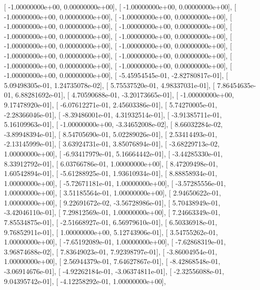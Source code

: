 \documentclass{article}
\begin{document}
       [ -1.00000000e+00,   0.00000000e+00],
       [ -1.00000000e+00,   0.00000000e+00],
       [ -1.00000000e+00,   0.00000000e+00],
       [ -1.00000000e+00,   0.00000000e+00],
       [ -1.00000000e+00,   0.00000000e+00],
       [ -1.00000000e+00,   0.00000000e+00],
       [ -1.00000000e+00,   0.00000000e+00],
       [ -1.00000000e+00,   0.00000000e+00],
       [ -1.00000000e+00,   0.00000000e+00],
       [ -1.00000000e+00,   0.00000000e+00],
       [ -1.00000000e+00,   0.00000000e+00],
       [ -1.00000000e+00,   0.00000000e+00],
       [ -1.00000000e+00,   0.00000000e+00],
       [ -1.00000000e+00,   0.00000000e+00],
       [ -1.00000000e+00,   0.00000000e+00],
       [ -5.45954545e-01,  -2.82780817e-01],
       [  5.09498305e-01,   1.24735078e-02],
       [  5.75537520e-01,   4.98337031e-01],
       [  7.86454635e-01,   6.88281692e-01],
       [  4.70590688e-01,  -3.20173665e-01],
       [ -1.00000000e+00,   9.17478920e-01],
       [ -6.07612271e-01,   2.45603386e-01],
       [  5.74270005e-01,  -2.28366046e-01],
       [ -8.39486001e-01,   4.31932514e-01],
       [ -3.91385711e-01,   5.16109963e-01],
       [ -1.00000000e+00,  -3.34652008e-02],
       [  8.66032284e-02,  -3.89948394e-01],
       [  8.54705690e-01,   5.02289026e-01],
       [  2.53414493e-01,  -2.13145999e-01],
       [  3.63924731e-01,   3.85076894e-01],
       [ -3.68229713e-02,   1.00000000e+00],
       [ -6.93417979e-01,   5.16664442e-01],
       [ -3.44285330e-01,   8.33912792e-01],
       [  6.03766786e-01,   1.00000000e+00],
       [  8.47209498e-01,   1.60542894e-01],
       [ -5.61288925e-01,   1.93610934e-01],
       [  8.88858934e-01,   1.00000000e+00],
       [ -5.72671181e-01,   1.00000000e+00],
       [ -3.57285556e-01,   1.00000000e+00],
       [  3.51185564e-01,   1.00000000e+00],
       [  2.94650622e-01,   1.00000000e+00],
       [  9.22691672e-02,  -3.56728986e-01],
       [  5.70438949e-01,  -3.42046110e-01],
       [  7.29812569e-01,   1.00000000e+00],
       [  7.24663349e-01,   7.85534875e-01],
       [ -2.51668927e-01,   6.56979610e-01],
       [  6.50336918e-01,   9.76852911e-01],
       [  1.00000000e+00,   5.12743906e-01],
       [  3.54755262e-01,   1.00000000e+00],
       [ -7.65192089e-01,   1.00000000e+00],
       [ -7.62868319e-01,   3.96874688e-02],
       [  7.83649023e-01,   7.92398797e-01],
       [ -3.86004954e-01,   1.00000000e+00],
       [  2.56944379e-01,   7.64627867e-01],
       [ -8.42868548e-01,  -3.06914676e-01],
       [ -4.92262184e-01,  -3.06374811e-01],
       [ -2.32556088e-01,   9.04395742e-01],
       [ -4.12258292e-01,   1.00000000e+00],
\end{document}
